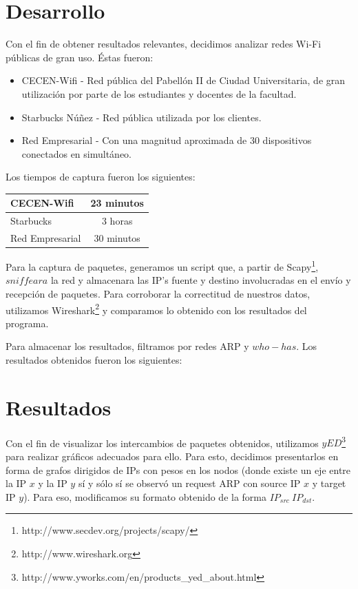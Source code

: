 \documentclass[10pt, a4paper]{article}
\begin{document}
\section{Desarrollo}

Con el fin de obtener resultados relevantes, decidimos analizar redes Wi-Fi públicas de gran uso. Éstas fueron:

\begin{itemize}
\item CECEN-Wifi - Red pública del Pabellón II de Ciudad Universitaria, de gran utilización por parte de los estudiantes y docentes de la facultad.
\item Starbucks Núñez - Red pública utilizada por los clientes.
\item Red Empresarial - Con una magnitud aproximada de 30 dispositivos conectados en simultáneo.
\end{itemize}

Los tiempos de captura fueron los siguientes:

\begin{center}
  \begin{tabular}{| l | c |}
    \hline
    CECEN-Wifi & 23 minutos\\ \hline
    Starbucks & 3 horas\\ \hline
    Red Empresarial & 30 minutos\\
    \hline
  \end{tabular}
\end{center}

Para la captura de paquetes, generamos un script que, a partir de Scapy\footnote{http://www.secdev.org/projects/scapy/}, $sniffeara$ la red y almacenara las IP's fuente y destino involucradas en el envío y recepción de paquetes. Para corroborar la correctitud de nuestros datos, utilizamos Wireshark\footnote{http://www.wireshark.org} y comparamos lo obtenido con los resultados del programa. 

Para almacenar los resultados, filtramos por redes ARP y $who-has$. Los resultados obtenidos fueron los siguientes:

\section{Resultados}
Con el fin de visualizar los intercambios de paquetes obtenidos, utilizamos $yED$\footnote{http://www.yworks.com/en/products\_yed\_about.html} para realizar gráficos adecuados para ello. Para esto, decidimos presentarlos en forma de grafos dirigidos de IPs con pesos en los nodos (donde existe un eje entre la IP $x$ y la IP $y$ sí y sólo sí se observó un request ARP con source IP $x$ y target IP $y$). Para eso, modificamos su formato obtenido de la forma $IP_{src}\ IP_{dst}$.
\end{document}
